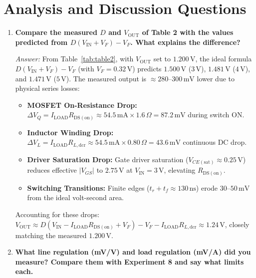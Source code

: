 \documentclass[12pt,a4paper]{article}
\newcommand{\Vout}{V_{\mathrm{OUT}}}
\newcommand{\Vin}{V_{\mathrm{IN}}}
\newcommand{\Iload}{I_{\mathrm{LOAD}}}
\newcommand{\Rdson}{R_{\mathrm{DS(on)}}}
\newcommand{\DCR}{R_{L,\mathrm{dcr}}}
\begin{document}
\section{Analysis and Discussion Questions}
\label{sec:discussion}

\begin{enumerate}[leftmargin=1.8em, label=\textbf{Q\arabic*.}, itemsep=1.0em]

    \item \textbf{Compare the measured $D$ and $\Vout$ of Table 2 with the values predicted from $D(\Vin + V_F) - V_F$. What explains the difference?}
    
    \emph{Answer:}
    From Table~\ref{tab:table2}, with $\Vout$ set to $1.200\,\mathrm{V}$, the ideal formula $D(\Vin + V_F) - V_F$ (with $V_F = 0.32\,\mathrm{V}$) predicts $1.500\,\mathrm{V}$ ($3\,\mathrm{V}$), $1.481\,\mathrm{V}$ ($4\,\mathrm{V}$), and $1.471\,\mathrm{V}$ ($5\,\mathrm{V}$). The measured output is $\approx 280\text{--}300\,\mathrm{mV}$ lower due to physical series losses:
    \begin{itemize}[itemsep=2pt, topsep=2pt]
        \item \textbf{MOSFET On-Resistance Drop:} $\Delta V_Q = \Iload \Rdson \approx 54.5\,\mathrm{mA} \times 1.6\,\Omega = 87.2\,\mathrm{mV}$ during switch ON.
        \item \textbf{Inductor Winding Drop:} $\Delta V_L = \Iload \DCR \approx 54.5\,\mathrm{mA} \times 0.80\,\Omega = 43.6\,\mathrm{mV}$ continuous DC drop.
        \item \textbf{Driver Saturation Drop:} Gate driver saturation ($V_{CE(\mathrm{sat})} \approx 0.25\,\mathrm{V}$) reduces effective $|V_{GS}|$ to $2.75\,\mathrm{V}$ at $\Vin = 3\,\mathrm{V}$, elevating $\Rdson$.
        \item \textbf{Switching Transitions:} Finite edges ($t_r + t_f \approx 130\,\mathrm{ns}$) erode $30\text{--}50\,\mathrm{mV}$ from the ideal volt-second area.
    \end{itemize}
    Accounting for these drops: $\Vout \approx D(\Vin - \Iload \Rdson + V_F) - V_F - \Iload \DCR \approx 1.24\,\mathrm{V}$, closely matching the measured $1.200\,\mathrm{V}$.

    \item \textbf{What line regulation (mV/V) and load regulation (mV/A) did you measure? Compare them with Experiment 8 and say what limits each.}
    

\end{enumerate}
\end{document}
